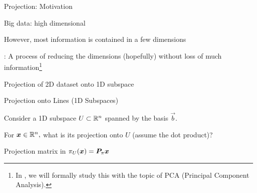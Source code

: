 \documentclass[handout,fleqn,aspectratio=169]{beamer}
\begin{document}
\begin{frame}{Projection: Motivation}

\plitemsep 0.05in

\bci 

\item Big data: high dimensional

\item However, most information is contained in a few dimensions

\item {}: A process of reducing the dimensions (hopefully) without loss of much information\footnote{In , we will formally study this with the topic of PCA (Principal Component Analysis).}

\item \exam Projection of 2D dataset onto 1D subspace

\centering
{}
\eci


\end{frame}

\begin{frame}{Projection onto Lines (1D Subspaces)}

\plitemsep 0.1in

\bci 
\item Consider a 1D subspace $U \subset {\mathbb R}^n$ spanned by the basis $\vec{b}.$ 

\item For $\bm{x} \in {\mathbb R}^{n},$ what is its projection  onto $U$ (assume the dot product)?
{
\small
{}
}
{
\vspace{-0.2cm}
}
\vspace{-0.5cm}
\item Projection matrix   in $\pi_U(\bm{x}) = \bm{P}_\pi \bm{x}$
\eci

\end{frame}
\end{document}

